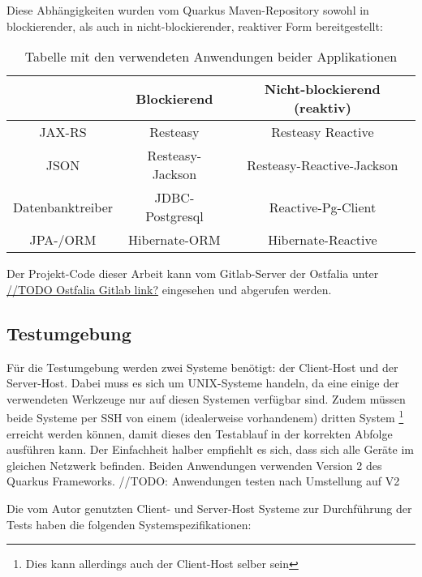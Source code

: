 Diese Abhängigkeiten wurden vom Quarkus Maven-Repository sowohl in blockierender,
als auch in nicht-blockierender, reaktiver Form bereitgestellt: \parencite{MavenQuarkusIO}
\setlength{\tabcolsep}{18pt}
\renewcommand{\arraystretch}{1.5}
\begin{table}[h!]
    \centering
    \begin{tabular}{| c | c | c |}
        \hline
                         & Blockierend      & Nicht-blockierend (reaktiv) \\
        \hline
        JAX-RS           & Resteasy         & Resteasy Reactive           \\
        \hline
        JSON             & Resteasy-Jackson & Resteasy-Reactive-Jackson   \\
        \hline
        Datenbanktreiber & JDBC-Postgresql  & Reactive-Pg-Client          \\
        \hline
        JPA-/ORM         & Hibernate-ORM    & Hibernate-Reactive          \\
        \hline
    \end{tabular}
    \caption{Tabelle mit den verwendeten Anwendungen beider Applikationen}
    \label{table:dependencies}
\end{table}
Der Projekt-Code dieser Arbeit kann vom Gitlab-Server der Ostfalia unter
\url{//TODO Ostfalia Gitlab link?} eingesehen und abgerufen werden.
\subsection{Testumgebung}
\label{section:testumgebung}
Für die Testumgebung werden zwei Systeme benötigt: der Client-Host und der Server-Host.
Dabei muss es sich um UNIX-Systeme handeln, da eine einige der verwendeten Werkzeuge nur 
auf diesen Systemen verfügbar sind.
Zudem müssen beide Systeme per SSH von einem (idealerweise vorhandenem) dritten System \footnote{Dies kann allerdings auch der Client-Host selber sein} 
erreicht werden können, damit dieses den Testablauf in der korrekten Abfolge ausführen kann. 
Der Einfachheit halber empfiehlt es sich, dass sich alle Geräte im gleichen Netzwerk befinden.
Beiden Anwendungen verwenden Version 2 des Quarkus Frameworks. //TODO: Anwendungen testen nach Umstellung auf V2

Die vom Autor genutzten Client- und Server-Host Systeme zur Durchführung der Tests haben die folgenden Systemspezifikationen:

